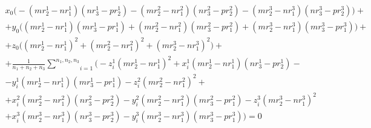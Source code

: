 $$\begin{gathered}
	x_0 \bigg( - (m r_2^1 - n r_1^1) (n r_3^1 - p r_2^1) - (m r_2^2 - n r_1^2) (n r_3^2 - p r_2^2) - (m r_2^3 - n r_1^3) (n r_3^3 - p r_2^3) \bigg) + \\
	+ y_0 \bigg( (m r_2^1 - n r_1^1) (m r_3^1 - p r_1^1) + (m r_2^2 - n r_1^2) (m r_3^2 - p r_1^2) + (m r_2^3 - n r_1^3) (m r_3^3 - p r_1^3) \bigg) + \\
	+ z_0 \bigg( (m r_2^1 - n r_1^1)^2 + (m r_2^2 - n r_1^2)^2 + (m r_2^3 - n r_1^3)^2 \bigg) + \\
	+ \frac{1}{n_1+n_2+n_3} \underset{i=1}{\overset{n_1, n_2, n_3}{\sum}} \bigg( 
		- z_i^1 (m r_2^1 - n r_1^1)^2
		+ x_i^1 (m r_2^1 - n r_1^1) (n r_3^1 - p r_2^1) - \\
		- y_i^1  (m r_2^1 - n r_1^1) (m r_3^1 - p r_1^1)
		- z_i^2 (m r_2^2 - n r_1^2)^2 + \\
		+ x_i^2  (m r_2^2 - n r_1^2) (n r_3^2 - p r_2^2)
		- y_i^2 (m r_2^2 - n r_1^2) (m r_3^2 - p r_1^2)
		- z_i^3 (m r_2^3 - n r_1^3)^2\\
		+ x_i^3 (m r_2^3 - n r_1^3) (n r_3^3 - p r_2^3)
		- y_i^3 (m r_2^3 - n r_1^3) (m r_3^3 - p r_1^3)
	 \bigg) = 0
\end{gathered}$$

